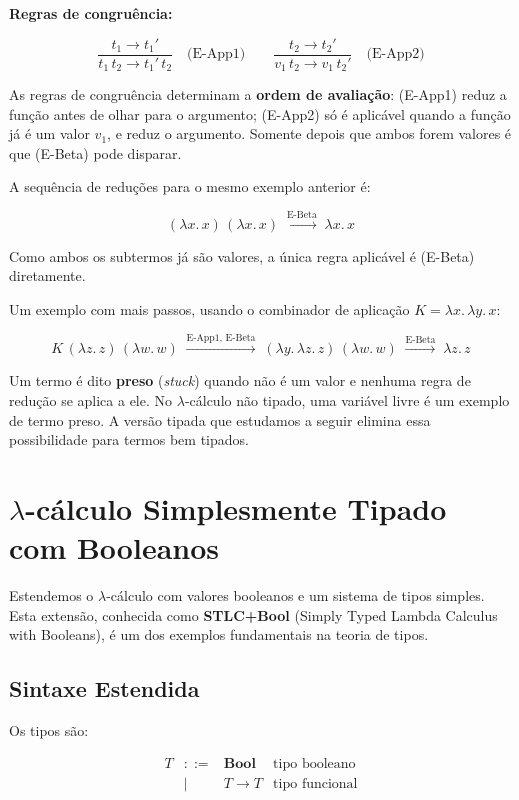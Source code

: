 \textbf{Regras de congruência:}

\[ \dfrac{t_1 \to t_1'}{t_1\, t_2 \to t_1'\, t_2} \quad\text{(E-App1)} \qquad
\dfrac{t_2 \to t_2'}{v_1\, t_2 \to v_1\, t_2'} \quad\text{(E-App2)} \]

As regras de congruência determinam a \textbf{ordem de avaliação}:
(E-App1) reduz a função antes de olhar para o argumento; (E-App2) só
é aplicável quando a função já é um valor \(v_1\), e reduz o
argumento. Somente depois que ambos forem valores é que (E-Beta) pode disparar.

A sequência de reduções para o mesmo exemplo anterior é:

\[ (\lambda x.\, x)\,(\lambda x.\, x) \;\xrightarrow{\text{E-Beta}}\;
\lambda x.\, x \]

Como ambos os subtermos já são valores, a única regra aplicável é
(E-Beta) diretamente.

Um exemplo com mais passos, usando o combinador de aplicação
\(K = \lambda x.\,\lambda y.\,
x\):

\[ K\,(\lambda z.\,z)\,(\lambda w.\,w) \;\xrightarrow{\text{E-App1,
  E-Beta}}\; (\lambda y.\, \lambda z.\,z)\,(\lambda w.\,w)
\;\xrightarrow{\text{E-Beta}}\; \lambda z.\,z \]

Um termo é dito \textbf{preso} (\emph{stuck}) quando não é um
valor e nenhuma regra de redução se aplica a ele. No $\lambda$-cálculo
não tipado, uma variável livre é um exemplo de termo preso. A
versão tipada que estudamos a seguir elimina essa possibilidade para
termos bem tipados.

\section{$\lambda$-cálculo Simplesmente Tipado com Booleanos}

Estendemos o $\lambda$-cálculo com valores booleanos e um sistema de
tipos simples. Esta extensão, conhecida como \textbf{STLC+Bool}
(Simply Typed Lambda Calculus with Booleans), é um dos exemplos
fundamentais na teoria de tipos.

\subsection{Sintaxe Estendida}

Os tipos são:

\[
  \begin{array}{rcll}
    T & ::= & \mathbf{Bool} & \text{tipo booleano} \\
    & |   & T \to T & \text{tipo funcional}
\end{array} \]

